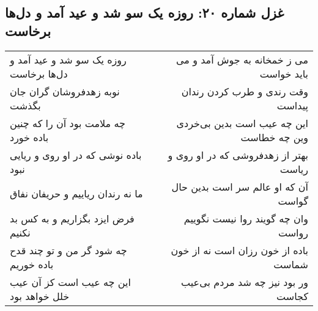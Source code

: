 \begin{center}
\section*{غزل شماره ۲۰: روزه یک سو شد و عید آمد و دل‌ها برخاست}
\label{sec:sh020}
\begin{longtable}{l p{0.5cm} r}
روزه یک سو شد و عید آمد و دل‌ها برخاست
&&
می ز خمخانه به جوش آمد و می باید خواست
\\
نوبه زهدفروشان گران جان بگذشت
&&
وقت رندی و طرب کردن رندان پیداست
\\
چه ملامت بود آن را که چنین باده خورد
&&
این چه عیب است بدین بی‌خردی وین چه خطاست
\\
باده نوشی که در او روی و ریایی نبود
&&
بهتر از زهدفروشی که در او روی و ریاست
\\
ما نه رندان ریاییم و حریفان نفاق
&&
آن که او عالم سر است بدین حال گواست
\\
فرض ایزد بگزاریم و به کس بد نکنیم
&&
وان چه گویند روا نیست نگوییم رواست
\\
چه شود گر من و تو چند قدح باده خوریم
&&
باده از خون رزان است نه از خون شماست
\\
این چه عیب است کز آن عیب خلل خواهد بود
&&
ور بود نیز چه شد مردم بی‌عیب کجاست
\\
\end{longtable}
\end{center}
